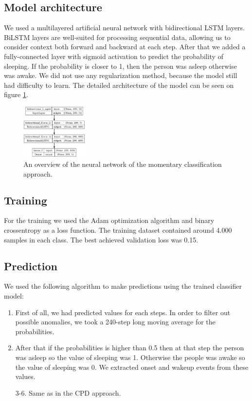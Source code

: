 \documentclass{article}
\begin{document}
\subsection{Model architecture}
We used a multilayered artificial neural network with bidirectional LSTM layers. BiLSTM layers are well-suited for processing sequential data, allowing us to consider context both forward and backward at each step. After that we added a fully-connected layer with sigmoid activation to predict the probability of sleeping. If the probability is closer to 1, then the person was asleep otherwise was awake. We did not use any regularization method, because the model still had difficulty to learn.
The detailed architecture of the model can be seen on figure \ref{fig:model-lstm}.

\begin{figure}
    \label{fig:model-lstm}
    \centering
    \includegraphics[width=0.3\textwidth]{model_plot-2.png}
    \caption{An overview of the neural network of the momentary classification approach.}
\end{figure}

\subsection{Training}
For the training we used the Adam optimization algorithm and binary crossentropy as a loss function. The training dataset contained around 4.000 samples in each class. The best achieved validation loss was 0.15.

\subsection{Prediction}
We used the following algorithm to make predictions using the trained classifier model:
\begin{enumerate}
    \item First of all, we had predicted values for each steps. In order to filter out possible anomalies, we took a 240-step long moving average for the probabilities.
    \item After that if the probabilities is higher than 0.5 then at that step the person was asleep so the value of sleeping was 1. Otherwise the people was awake so the value of sleeping was 0. We extracted onset and wakeup events from these values.
    \item[3-6.] Same as in the CPD approach.
\end{enumerate}
\end{document}
